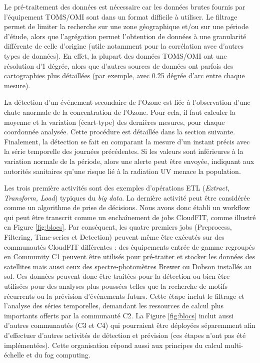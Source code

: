 Le pré-traitement des données est nécessaire car les données brutes fournis par l'équipement TOMS/OMI sont dans un format difficile à utiliser. Le filtrage permet de limiter la recherche sur une zone géographique et/ou sur une période d'étude, alors que l'agrégation permet l'obtention de données à une granularité différente de celle d'origine (utile notamment pour la corrélation avec d'autres types de données). En effet, la plupart des données TOMS/OMI ont une résolution d'1 dégrée, alors que d'autres sources de données ont parfois des cartographies plus détaillées (par exemple, avec 0.25 dégrée d'arc entre chaque mesure).

La détection d'un événement secondaire de l'Ozone est liée à l'observation d'une chute anormale de la concentration de l'Ozone. Pour cela, il faut calculer la moyenne et la variation (écart-type) des dernières mesures, pour chaque coordonnée analysée. Cette procédure est détaillée dans la section suivante. Finalement, la détection se fait en comparant la mesure d'un instant précis avec la série temporelle des journées précédentes. Si les valeurs sont inférieures à la variation normale de la période, alors une alerte peut être envoyée, indiquant aux autorités sanitaires qu'une risque lié à la radiation UV menace la population.

Les trois première activités sont des exemples d'opérations ETL (\textit{Extract, Transform, Load}) typiques du \textit{big data}. La dernière activité peut être considérée comme un algorithme de prise de décisions. Nous avons donc établi un workflow qui peut être transcrit comme un enchaînement de jobs CloudFIT, comme illustré en Figure \ref{fig:blocs}. Par conséquent, les quatre premiers jobs (Preprocess, Filtering, Time-series et Detection) peuvent même être exécutés sur des communautés CloudFIT différentes : des équipements entrée de gamme regroupés en Community C1 peuvent être utilisés pour pré-traiter et stocker les données des satellites mais aussi ceux des spectre-photomètres Brewer ou Dobson installés au sol. 
Ces données peuvent donc être traitées pour la détection ou bien être utilisées pour des analyses plus poussées telles que la recherche de motifs récurrents ou la prévision d'événements futurs. Cette étape inclut le filtrage et l'analyse des séries temporelles, demandant les ressources de calcul plus importants offerts par la communauté C2.
La Figure \ref{fig:blocs} inclut aussi d'autres communautés (C3 et C4) qui pourraient être déployées séparemment afin d'effectuer d'autres activités de détection et prévision (ces étapes n'ont pas été implémentées).
Cette organisation répond aussi aux principes du calcul multi-échelle et du fog computing.

